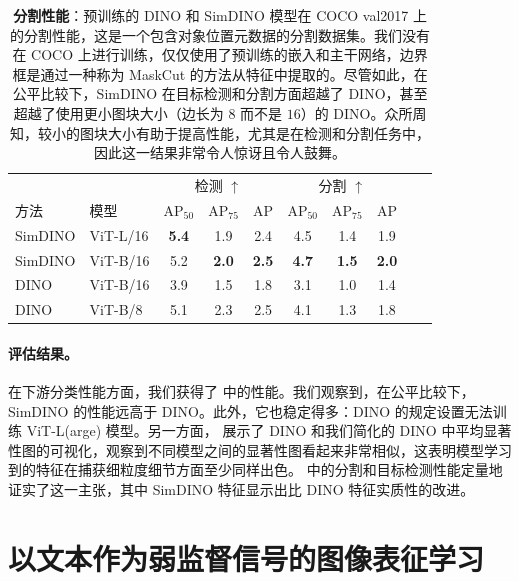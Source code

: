 \documentclass[../../book-main_zh.tex]{subfiles}
\begin{document}
\begin{table}
\caption{\small\textbf{分割性能}：预训练的 DINO 和 SimDINO 模型在 COCO val2017 \citep{lin2014microsoft} 上的分割性能，这是一个包含对象位置元数据的分割数据集。我们没有在 COCO 上进行训练，仅仅使用了预训练的嵌入和主干网络，边界框是通过一种称为 MaskCut \citep{wang2023cut} 的方法从特征中提取的。尽管如此，在公平比较下，SimDINO 在目标检测和分割方面超越了 DINO，甚至超越了使用更小图块大小（边长为 \(8\) 而不是 \(16\)）的 DINO。众所周知，较小的图块大小有助于提高性能，尤其是在检测和分割任务中，因此这一结果非常令人惊讶且令人鼓舞。}
\centering
\begin{tabular}{@{}llcccccccc@{}}
    \toprule
    &  & \multicolumn{3}{c}{检测 $\uparrow$} &
    \multicolumn{3}{c}{分割 $\uparrow$} \\
    方法 & 模型 & AP$_{50}$  & AP$_{75}$ & AP & AP$_{50}$ &
    AP$_{75}$ & AP  \\
    \midrule
    SimDINO &ViT-L/16 &\bf 5.4 &1.9 &2.4 &4.5 &1.4 &1.9 \\
    SimDINO &ViT-B/16 &5.2 & \bf 2.0 & \bf 2.5 & \bf4.7 & \bf 1.5 & \bf 2.0 \\
    DINO &ViT-B/16 &3.9 &1.5 &1.8 &3.1 &1.0 &1.4 \\
    \midrule
    \color{gray} DINO & \color{gray} ViT-B/8 & \color{gray}5.1 &
    \color{gray}2.3 & \color{gray}2.5 & \color{gray}4.1 &
    \color{gray}1.3 & \color{gray}1.8 \\
    \bottomrule
\end{tabular}
\label{tab:dino_segmentation}
\end{table}

\paragraph{评估结果。} 在下游分类性能方面，我们获得了  中的性能。我们观察到，在公平比较下，SimDINO 的性能远高于 DINO。此外，它也稳定得多：DINO 的规定设置无法训练 ViT-L(arge) 模型。另一方面， 展示了 DINO 和我们简化的 DINO 中平均显著性图的可视化，观察到不同模型之间的显著性图看起来非常相似，这表明模型学习到的特征在捕获细粒度细节方面至少同样出色。 中的分割和目标检测性能定量地证实了这一主张，其中 SimDINO 特征显示出比 DINO 特征实质性的改进。

\section{以文本作为弱监督信号的图像表征学习}\label{sec:CLIP}
\end{document}
